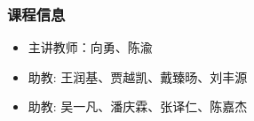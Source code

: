 



\begin{frame}
\titlepage %
\end{frame}

%
%

\begin{frame}
	\frametitle{课程信息}
	\begin{itemize}
		\item 主讲教师：向勇、陈渝
		\item 助教: 王润基、贾越凯、戴臻旸、刘丰源
		\item 助教: 吴一凡、潘庆霖、张译仁、陈嘉杰
	\end{itemize}
\end{frame}

